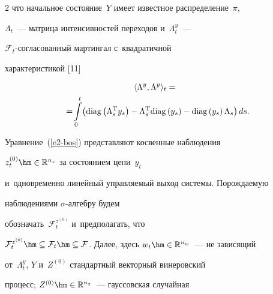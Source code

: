 \begin{multicols}{2}
что начальное состояние~$Y$ имеет известное распределение~$\pi$, 


$\Lambda_t$~--- матрица интенсивностей переходов и~$\Lambda_t^y$~---  


$\mathcal{F}_t$-со\-гла\-со\-ван\-ный мартингал с~квадратичной 


характеристикой [11]





\vspace*{-4pt}





\noindent


    \begin{multline*}


     \langle \Lambda^y, \Lambda^y\rangle_t ={}\\


     {}=\!\int\limits_0^t \!\left(\mathrm{diag}\left( 


\Lambda_s^{\mathrm{T}} y_s\right) -\Lambda_s^{\mathrm{T}} \mathrm{diag} \left( y_s\right) -\mathrm{diag}\left( y_s\right) 


\Lambda_s \right) ds.\hspace*{-2.25598pt}


   \end{multline*}


   


   \vspace*{-2pt}


     


     Уравнение~(\ref{e2-bos}) представляют косвенные наблюдения 


     $z_t^{(0)}\hm\in \mathbb{R}^{n_z}$ за состоянием цепи~$y_t$ 


и~одновременно линейный управляемый выход системы. Порождаемую 


наблюдениями $\sigma$-ал\-геб\-ру будем 


обозначать~$\mathcal{F}_t^{z^{(0)}}$ и~предполагать, что 


$\mathcal{F}_t^{z^{(0)}} \hm\subseteq \mathcal{F}_t\hm\subseteq 


\mathcal{F}$. Далее, здесь $w_t\hm\in \mathbb{R}^{n_w}$~--- не зависящий 


от~$\Lambda_t^y$, $Y$ и~$Z^{(0)}$ стандартный векторный винеровский 


процесс; $Z^{(0)}\hm\in \mathbb{R}^{n_z}$~--- гауссовская случайная 



\end{multicols}
